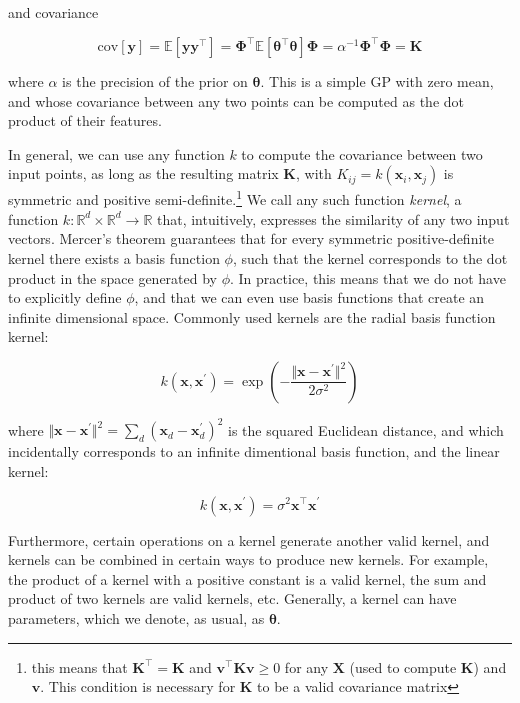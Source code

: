 \documentclass[a4paper,11pt]{kth-mag}
\begin{document}
\noindent and covariance

\begin{equation}
\text{cov}[\bm y]=\mathbb{E}[\bm y\bm y^\intercal]
=\bm\Phi^\intercal\mathbb{E}[\bm\theta^\intercal\bm\theta]\bm\Phi
=\alpha^{-1}\bm\Phi^\intercal\bm\Phi=\bm K
\end{equation}

\noindent where $\alpha$ is the precision of the prior on $\bm\theta$. This is a simple GP with zero mean, and whose covariance between any two points can be computed as the dot product of their features.

In general, we can use any function $k$ to compute the covariance between two input points, as long as the resulting matrix $\bm K$, with $K_{ij}=k(\bm x_i,\bm x_j)$ is symmetric and positive semi-definite.\footnote{this means that $\bm K^\intercal=\bm K$ and $\bm v^\intercal\bm K\bm v\geq 0$ for any $\bm X$ (used to compute $\bm K$) and $\bm v$. This condition is necessary for $\bm K$ to be a valid covariance matrix} We call any such function  \emph{kernel}, a function $k:\mathbb{R}^d\times\mathbb{R}^d\rightarrow\mathbb{R}$ that, intuitively, expresses the similarity of any two input vectors. Mercer's theorem guarantees that for every symmetric positive-definite kernel there exists a basis function $\phi$, such that the kernel corresponds to the dot product in the space generated by $\phi$. In practice, this means that we do not have to explicitly define $\phi$, and that we can even use basis functions that create an infinite dimensional space. Commonly used kernels are the radial basis function kernel:

\begin{equation}
k(\bm x, \bm x^\prime)=\exp\left(-\frac{\Vert\bm x-\bm x^\prime\Vert^2}{2\sigma^2}\right)
\end{equation}

\noindent where $\Vert\bm x-\bm x^\prime\Vert^2=\sum_d(\bm x_d-\bm x_d^\prime)^2$ is the squared Euclidean distance, and which incidentally corresponds to an infinite dimentional basis function, and the linear kernel:

\begin{equation}
k(\bm x, \bm x^\prime)=\sigma^2\bm x^\intercal\bm x^\prime
\end{equation}

Furthermore, certain operations on a kernel generate another valid kernel, and kernels can be combined in certain ways to produce new kernels. For example, the product of a kernel with a positive constant is a valid kernel, the sum and product of two kernels are valid kernels, etc. Generally, a kernel can have parameters, which we denote, as usual, as $\bm\theta$.
\end{document}
